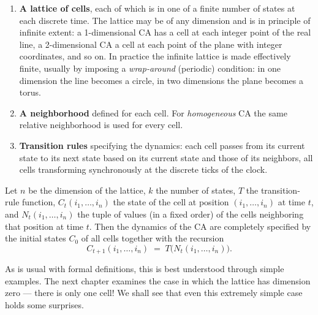 \begin{enumerate}
\item \textbf{A lattice of cells}, each of which is in one of a finite
  number of states at each discrete time.  The lattice may be of any
  dimension and is in principle of infinite extent: a 1-dimensional CA
  has a cell at each integer point of the real line, a 2-dimensional CA
  a cell at each point of the plane with integer coordinates, and so
  on.  In practice the infinite lattice is made effectively finite,
  usually by imposing a \emph{wrap-around} (periodic) condition: in one
  dimension the line becomes a circle, in two dimensions the plane
  becomes a torus.
\item \textbf{A neighborhood} defined for each cell.  For
  \emph{homogeneous} CA the same relative neighborhood is used for
  every cell.
\item \textbf{Transition rules} specifying the dynamics: each cell
  passes from its current state to its next state based on its current
  state and those of its neighbors, all cells transforming
  synchronously at the discrete ticks of the clock.
\end{enumerate}

Let $n$ be the dimension of the lattice, $k$ the number of states, $T$
the transition-rule function, $C_t(i_1,\dots,i_n)$ the state of the
cell at position $(i_1,\dots,i_n)$ at time $t$, and
$N_t(i_1,\dots,i_n)$ the tuple of values (in a fixed order) of the
cells neighboring that position at time $t$.  Then the dynamics of the
CA are completely specified by the initial states $C_0$ of all cells
together with the recursion
\begin{equation}
  C_{t+1}(i_1,\dots,i_n) \;=\; T\bigl(N_t(i_1,\dots,i_n)\bigr).
  \label{eq:ca-recursion}
\end{equation}

As is usual with formal definitions, this is best understood through
simple examples.  The next chapter examines the case in which the
lattice has dimension zero --- there is only one cell!  We shall see
that even this extremely simple case holds some surprises.
